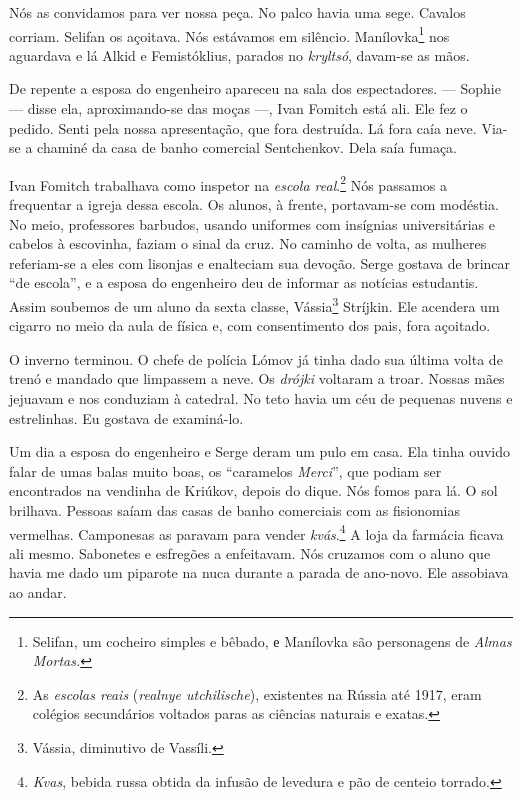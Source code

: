 Nós as convidamos para ver nossa peça. No palco havia uma sege. Cavalos
corriam. Selifan os açoitava. Nós estávamos em silêncio.
Manílovka\footnote{Selifan, um cocheiro simples e bêbado, е Manílovka
  são personagens de \emph{Almas Mortas. }} nos aguardava e lá Alkid e
Femistóklius, parados no \emph{kryltsó}, davam-se as mãos.

De repente a esposa do engenheiro apareceu na sala dos espectadores. ---
Sophie --- disse ela, aproximando-se das moças ---, Ivan Fomitch está
ali. Ele fez o pedido. Senti pela nossa apresentação, que fora
destruída. Lá fora caía neve. Via-se a chaminé da casa de banho
comercial Sentchenkov. Dela saía fumaça.

Ivan Fomitch trabalhava como inspetor na \emph{escola real}.\footnote{As
  \emph{escolas reais} (\emph{realnye utchilische}), existentes na
  Rússia até 1917, eram colégios secundários voltados paras as ciências
  naturais e exatas.} Nós passamos a frequentar a igreja dessa escola.
Os alunos, à frente, portavam-se com modéstia. No meio, professores
barbudos, usando uniformes com insígnias universitárias e cabelos à
escovinha, faziam o sinal da cruz. No caminho de volta, as mulheres
referiam-se a eles com lisonjas e enalteciam sua devoção. Serge gostava
de brincar ``de escola'', e a esposa do engenheiro deu de informar as
notícias estudantis. Assim soubemos de um aluno da sexta classe,
Vássia\footnote{Vássia, diminutivo de Vassíli.} Stríjkin. Ele acendera
um cigarro no meio da aula de física e, com consentimento dos pais, fora
açoitado.

O inverno terminou. O chefe de polícia Lómov já tinha dado sua última
volta de trenó e mandado que limpassem a neve. Os \emph{drójki} voltaram
a troar. Nossas mães jejuavam e nos conduziam à catedral. No teto havia
um céu de pequenas nuvens e estrelinhas. Eu gostava de examiná-lo.

Um dia a esposa do engenheiro e Serge deram um pulo em casa. Ela tinha
ouvido falar de umas balas muito boas, os ``caramelos \emph{Merci}'',
que podiam ser encontrados na vendinha de Kriúkov, depois do dique. Nós
fomos para lá. O sol brilhava. Pessoas saíam das casas de banho
comerciais com as fisionomias vermelhas. Camponesas as paravam para
vender \emph{kvás}.\footnote{\emph{Kvas}, bebida russa obtida da infusão
  de levedura e pão de centeio torrado.} A loja da farmácia ficava ali
mesmo. Sabonetes e esfregões a enfeitavam. Nós cruzamos com o aluno que
havia me dado um piparote na nuca durante a parada de ano-novo. Ele
assobiava ao andar.

